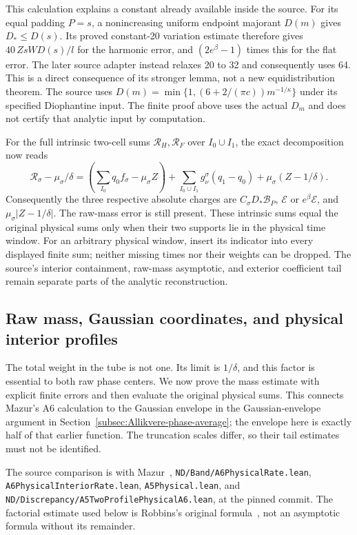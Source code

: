 This calculation explains a constant already available inside the
source. For its equal padding $P=s$, a nonincreasing uniform
endpoint majorant $D(m)$ gives $D_*\le D(s)$.
Its proved constant-20 variation estimate therefore gives
$40\,ZsW D(s)/l$ for the harmonic error, and
$(2e^\beta-1)$ times this for the flat error.
The later source adapter instead relaxes 20 to 32 and consequently
uses 64. This is a direct consequence of its stronger lemma, not
a new equidistribution theorem. The source uses
$D(m)=\min\{1,(6+2/(\pi c))m^{-1/\kappa}\}$ under its
specified Diophantine input. The finite proof above uses the
actual $D_m$ and does not certify that analytic input by computation.

For the full intrinsic two-cell sums $\mathcal R_H,\mathcal R_F$
over $I_0\cup I_1$, the exact decomposition now reads
\[
 \mathcal R_\sigma-\mu_\sigma/\delta
 =\left(\sum_{I_0}q_0f_\sigma-\mu_\sigma Z\right)
       +\sum_{I_0\cup I_1}g_\nu^\sigma(q_1-q_0)
       +\mu_\sigma(Z-1/\delta).
\]
Consequently the three respective absolute charges are
$C_\sigma D_*\mathcal B_P$,
$\mathcal E$ or $e^\beta\mathcal E$,
and $\mu_\sigma|Z-1/\delta|$.
The raw-mass error is still present. These intrinsic sums equal
the original physical sums only when their two supports lie in
the physical time window. For an arbitrary physical window, insert
its indicator into every displayed finite sum; neither missing
times nor their weights can be dropped. The source's interior
containment, raw-mass asymptotic, and exterior coefficient tail
remain separate parts of the analytic reconstruction.

\subsection{Raw mass, Gaussian coordinates, and physical interior profiles}
\label{sec:Mazur-mass-interior}

The total weight in the tube is not one. Its limit is $1/\delta$,
and this factor is essential to both raw phase centers. We now prove
the mass estimate with explicit finite errors and then evaluate the
original physical sums. This connects Mazur's A6 calculation to the
Gaussian envelope in the Gaussian-envelope argument in Section~\ref{subsec:Allikvere-phase-average}; the envelope here
is exactly half of that earlier function. The truncation scales differ,
so their tail estimates must not be identified.

The source comparison is with Mazur~\cite{Mazur2026v2},
\texttt{ND/Band/A6PhysicalRate.lean},
\texttt{A6PhysicalInteriorRate.lean}, \texttt{A5Physical.lean},
and \texttt{ND/Discrepancy/A5TwoProfilePhysicalA6.lean}, at the pinned
commit. The factorial estimate used below is Robbins's original
formula~\cite[(1)--(2), p.~26]{Robbins1955}, not an asymptotic formula
without its remainder.

